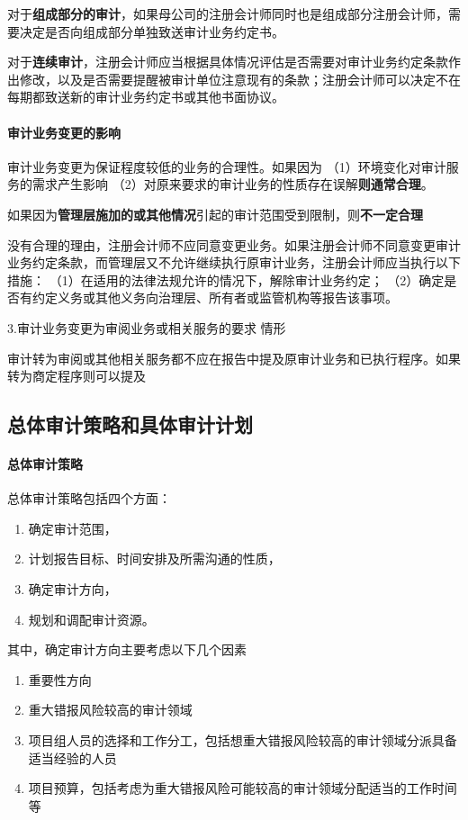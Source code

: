 \documentclass[UTF8,12pt]{ctexart}
\numberwithin{equation}{section} %
\numberwithin{figure}{section}
\numberwithin{table}{section}
\begin{document}
	
	
	对于\textbf{组成部分的审计}，如果母公司的注册会计师同时也是组成部分注册会计师，需要决定是否向组成部分单独致送审计业务约定书。
	
	对于\textbf{连续审计}，注册会计师应当根据具体情况评估是否需要对审计业务约定条款作出修改，以及是否需要提醒被审计单位注意现有的条款；注册会计师可以决定不在每期都致送新的审计业务约定书或其他书面协议。
	
	\paragraph{审计业务变更的影响}
	审计业务变更为保证程度较低的业务的合理性。如果因为
	（1）环境变化对审计服务的需求产生影响
	（2）对原来要求的审计业务的性质存在误解\textbf{则通常合理}。
	
	如果因为\textbf{管理层施加的或其他情况}引起的审计范围受到限制，则\textbf{不一定合理}
	
	
	没有合理的理由，注册会计师不应同意变更业务。如果注册会计师不同意变更审计业务约定条款，而管理层又不允许继续执行原审计业务，注册会计师应当执行以下措施：
	（1）在适用的法律法规允许的情况下，解除审计业务约定；
	（2）确定是否有约定义务或其他义务向治理层、所有者或监管机构等报告该事项。
	
	3.审计业务变更为审阅业务或相关服务的要求
	情形
	
	审计转为审阅或其他相关服务都不应在报告中提及原审计业务和已执行程序。如果转为商定程序则可以提及
	\subsection{总体审计策略和具体审计计划}
	\paragraph{总体审计策略}
	总体审计策略包括四个方面：
	\begin{enumerate}
		\item 确定审计范围，
		
		\item 计划报告目标、时间安排及所需沟通的性质，
		
		\item 确定审计方向，
		
		\item 规划和调配审计资源。
	\end{enumerate}
	
	其中，确定审计方向主要考虑以下几个因素
	\begin{enumerate}
		\item 重要性方向
		
		\item 重大错报风险较高的审计领域
		
		\item 项目组人员的选择和工作分工，包括想重大错报风险较高的审计领域分派具备适当经验的人员
		
		\item 项目预算，包括考虑为重大错报风险可能较高的审计领域分配适当的工作时间等
	\end{enumerate}
	
\end{document}
